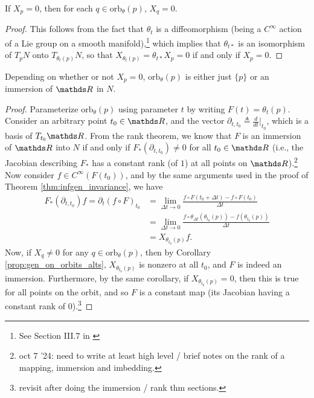 \begin{cor}\label{prop:gen_on_orbits_alts}
If $X_p=0$, then for each $q\in \text{orb}_{\theta}(p)$, $X_q=0$.
\end{cor}
\begin{proof}
 This follows from the fact that $\theta_t$ is a diffeomorphism (being a $C^{\infty}$ action of a Lie group on a smooth manifold),\footnote{See Section III.7 in \cite{boothby_2002}} which implies that $\theta_{t*}$ is an isomorphism of $T_{p}N$ onto $T_{\theta_t(p)}N$, so that $X_{\theta_t(p)}=\theta_{t*}X_p = 0$ if and only if $X_p=0$. 
 \end{proof}

\begin{thm}
Depending on whether or not $X_p=0$, $\text{orb}_{\theta}(p)$ is either just $\{p\}$ or an immersion of $\R$ in $N$. 
\end{thm}
\begin{proof}
Parameterize $\text{orb}_{\theta}(p)$ using parameter $t$ by writing $F(t) = \theta_t(p)$. Consider an arbitrary point $t_0\in \R$, and the vector $\partial_{t, t_0}\triangleq \frac{d}{dt}\bigr|_{t_0}$, which is a basis of $T_{t_0}\R$. 
 From the rank theorem, we know that $F$ is an immersion of $\R$ into $N$ if and only if $F_*\left(\partial_{t, t_0}\right) \neq 0$ for all $t_0\in \R$ (i.e., the Jacobian describing $F_*$ has a constant rank (of $1$) at all points on $\R$).\footnote{{\color{red}oct 7 '24: need to write at least high level / brief notes on the rank of a mapping, immersion and imbedding. }} Now consider $f\in C^{\infty}(F(t_0))$, and by the same arguments used in the proof of Theorem \ref{thm:infgen_invariance}, we have 
 \begin{equation}\begin{aligned}\label{eq:orbit_immersion}
F_*(\partial_{t,t_0})f = \partial_{t}\left(f\circ F\right)_{t_0} &={} \lim_{\Delta t \rightarrow 0}\frac{f\circ F\left(t_0 + \Delta t\right)-f\circ F(t_0)}{\Delta t}\\
&={} \lim_{\Delta t \rightarrow 0}\frac{f\circ \theta_{\Delta t}\left(\theta_{t_0}(p)\right)-f\left(\theta_{t_0}(p)\right)}{\Delta t}\\
&={} X_{\theta_{t_0}(p)}f. 
\end{aligned}\end{equation}
Now, if $X_q \neq 0$ for any $q\in \text{orb}_{\theta}(p)$, then by Corollary \ref{prop:gen_on_orbits_alts}, $X_{\theta_{t_0}(p)}$ is nonzero at all $t_0$, and $F$ is indeed an immersion. Furthermore, by the same corollary, if $X_{\theta_{t_0}(p)} = 0$, then this is true for all points on the orbit, and so $F$ is a constant map (its Jacobian having a constant rank of $0$).\footnote{revisit after doing the immersion / rank thm sections.}
\end{proof}
